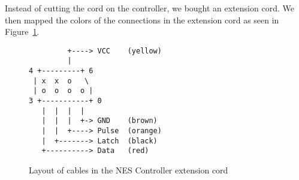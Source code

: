 Instead of cutting the cord on the controller, we bought an extension cord. We then mapped the colors of the connections in the extension cord as seen in Figure~\ref{fig:nes}.

\begin{figure}
\centering
\begin{BVerbatim}
         +----> VCC    (yellow)
         |
4 +---------+ 6
 | x  x  o   \
 | o  o  o  o |
3 +-----------+ 0
   |  |  |  |
   |  |  |  +-> GND    (brown)
   |  |  +----> Pulse  (orange)
   |  +-------> Latch  (black)
   +----------> Data   (red)
\end{BVerbatim}
\caption{Layout of cables in the NES Controller extension cord}
\label{fig:nes}
\end{figure}





